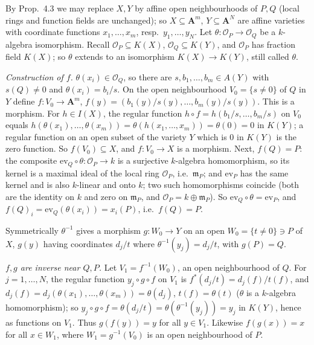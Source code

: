 \documentclass[11pt]{article}
\begin{document}
\pf
By Prop.~4.3 we may replace $X,Y$ by affine open neighbourhoods of $P,Q$ (local rings and function fields are unchanged); so $X\subseteq\mathbf A^m$, $Y\subseteq\mathbf A^N$ are affine varieties with coordinate functions $x_1,\dots,x_m$, resp.\ $y_1,\dots,y_N$. Let $\theta:\mathcal O_P\to\mathcal O_Q$ be a $k$-algebra isomorphism. Recall $\mathcal O_P\subseteq K(X)$, $\mathcal O_Q\subseteq K(Y)$, and $\mathcal O_P$ has fraction field $K(X)$; so $\theta$ extends to an isomorphism $K(X)\to K(Y)$, still called $\theta$.

\emph{Construction of $f$.} $\theta(x_i)\in\mathcal O_Q$, so there are $s,b_1,\dots,b_m\in A(Y)$ with $s(Q)\ne0$ and $\theta(x_i)=b_i/s$. On the open neighbourhood $V_0=\{s\ne0\}$ of $Q$ in $Y$ define $f:V_0\to\mathbf A^m$, $f(y)=(b_1(y)/s(y),\dots,b_m(y)/s(y))$. This is a morphism. For $h\in I(X)$, the regular function $h\circ f=h(b_1/s,\dots,b_m/s)$ on $V_0$ equals $h(\theta(x_1),\dots,\theta(x_m))=\theta(h(x_1,\dots,x_m))=\theta(0)=0$ in $K(Y)$; a regular function on an open subset of the variety $Y$ which is $0$ in $K(Y)$ is the zero function. So $f(V_0)\subseteq X$, and $f:V_0\to X$ is a morphism. Next, $f(Q)=P$: the composite $\mathrm{ev}_Q\circ\theta:\mathcal O_P\to k$ is a surjective $k$-algebra homomorphism, so its kernel is a maximal ideal of the local ring $\mathcal O_P$, i.e.\ $\mathfrak m_P$; and $\mathrm{ev}_P$ has the same kernel and is also $k$-linear and onto $k$; two such homomorphisms coincide (both are the identity on $k$ and zero on $\mathfrak m_P$, and $\mathcal O_P=k\oplus\mathfrak m_P$). So $\mathrm{ev}_Q\circ\theta=\mathrm{ev}_P$, and $f(Q)_i=\mathrm{ev}_Q(\theta(x_i))=x_i(P)$, i.e.\ $f(Q)=P$.

Symmetrically $\theta^{-1}$ gives a morphism $g:W_0\to Y$ on an open $W_0=\{t\ne0\}\ni P$ of $X$, $g(y)$ having coordinates $d_j/t$ where $\theta^{-1}(y_j)=d_j/t$, with $g(P)=Q$.

\emph{$f,g$ are inverse near $Q,P$.} Let $V_1=f^{-1}(W_0)$, an open neighbourhood of $Q$. For $j=1,\dots,N$, the regular function $y_j\circ g\circ f$ on $V_1$ is $f^*(d_j/t)=d_j(f)/t(f)$, and $d_j(f)=d_j(\theta(x_1),\dots,\theta(x_m))=\theta(d_j)$, $t(f)=\theta(t)$ ($\theta$ is a $k$-algebra homomorphism); so $y_j\circ g\circ f=\theta(d_j/t)=\theta(\theta^{-1}(y_j))=y_j$ in $K(Y)$, hence as functions on $V_1$. Thus $g(f(y))=y$ for all $y\in V_1$. Likewise $f(g(x))=x$ for all $x\in W_1$, where $W_1=g^{-1}(V_0)$ is an open neighbourhood of $P$.
\end{document}
